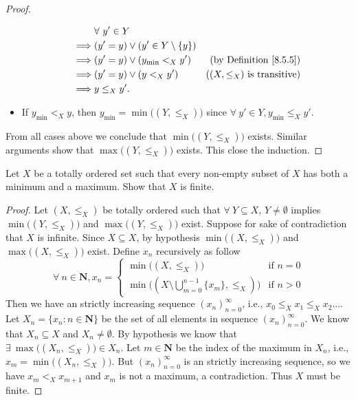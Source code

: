 \begin{proof}
\begin{itemize}
\begin{align*}
                           & \forall\ y' \in Y                                                                 \\
                  \implies & (y' = y) \lor (y' \in Y \setminus \{y\})                                          \\
                  \implies & (y' = y) \lor (y_{\min} <_X y')          & \text{(by Definition \ref{8.5.5})}     \\
                  \implies & (y' = y) \lor (y <_X y')                 & \text{(\((X, \leq_X)\) is transitive)} \\
                  \implies & y \leq_X y'.
              \end{align*}
        \item If \(y_{\min} <_X y\), then \(y_{\min} = \min\big((Y, \leq_X)\big)\) since \(\forall\ y' \in Y, y_{\min} \leq_X y'\).
    \end{itemize}
    From all cases above we conclude that \(\min\big((Y, \leq_X)\big)\) exists.
    Similar arguments show that \(\max\big((Y, \leq_X)\big)\) exists.
    This close the induction.
\end{proof}

\begin{exercise}\label{ex 8.5.9}
    Let \(X\) be a totally ordered set such that every non-empty subset of \(X\) has both a minimum and a maximum.
    Show that \(X\) is finite.
\end{exercise}

\begin{proof}
    Let \((X, \leq_X)\) be totally ordered such that \(\forall\ Y \subseteq X\), \(Y \neq \emptyset\) implies \(\min\big((Y, \leq_X)\big)\) and \(\max\big((Y, \leq_X)\big)\) exist.
    Suppose for sake of contradiction that \(X\) is infinite.
    Since \(X \subseteq X\), by hypothesis \(\min\big((X, \leq_X)\big)\) and \(\max\big((X, \leq_X)\big)\) exist.
    Define \(x_n\) recursively as follow
    \[
        \forall\ n \in \mathbf{N}, x_n = \begin{cases}
            \min\big((X, \leq_X)\big)                                           & \text{if } n = 0 \\
            \min\big((X \setminus \bigcup_{m = 0}^{n - 1} \{x_m\}, \leq_X)\big) & \text{if } n > 0
        \end{cases}
    \]
    Then we have an strictly increasing sequence \((x_n)_{n = 0}^\infty\), i.e., \(x_0 \leq_X x_1 \leq_X x_2 \dots\).
    Let \(X_n = \{x_n : n \in \mathbf{N}\}\) be the set of all elements in sequence \((x_n)_{n = 0}^\infty\).
    We know that \(X_n \subseteq X\) and \(X_n \neq \emptyset\).
    By hypothesis we know that \(\exists\ \max\big((X_n, \leq_X)\big) \in X_n\).
    Let \(m \in \mathbf{N}\) be the index of the maximum in \(X_n\), i.e., \(x_m = \min\big((X_n, \leq_X)\big)\).
    But \((x_n)_{n = 0}^\infty\) is an strictly increasing sequence, so we have \(x_m <_X x_{m + 1}\) and \(x_m\) is not a maximum, a contradiction.
    Thus \(X\) must be finite.
\end{proof}

